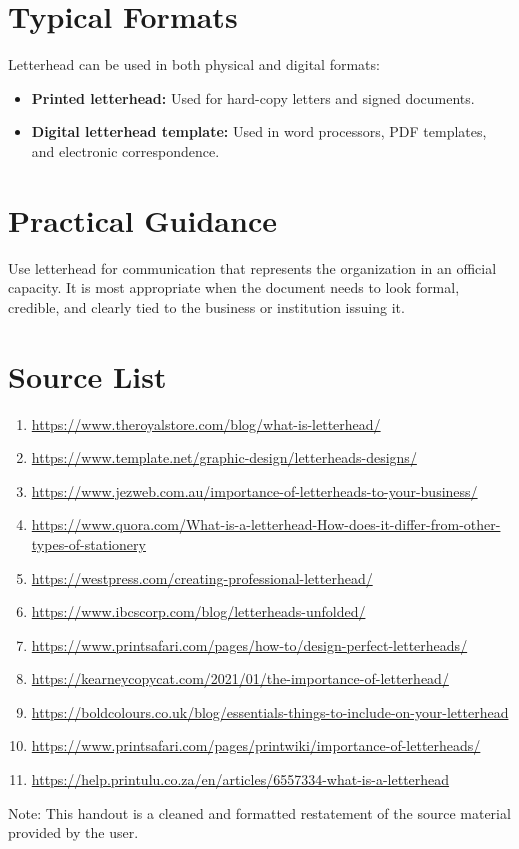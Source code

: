 \documentclass[11pt]{article}
\begin{document}
\section*{Typical Formats}
Letterhead can be used in both physical and digital formats:
\begin{itemize}[leftmargin=1.5em]
    \item \textbf{Printed letterhead:} Used for hard-copy letters and signed documents.
    \item \textbf{Digital letterhead template:} Used in word processors, PDF templates, and electronic correspondence.
\end{itemize}

\section*{Practical Guidance}
Use letterhead for communication that represents the organization in an official capacity. It is most appropriate when the document needs to look formal, credible, and clearly tied to the business or institution issuing it.

\section*{Source List}
\begin{enumerate}[leftmargin=1.75em]
    \item \url{https://www.theroyalstore.com/blog/what-is-letterhead/}
    \item \url{https://www.template.net/graphic-design/letterheads-designs/}
    \item \url{https://www.jezweb.com.au/importance-of-letterheads-to-your-business/}
    \item \url{https://www.quora.com/What-is-a-letterhead-How-does-it-differ-from-other-types-of-stationery}
    \item \url{https://westpress.com/creating-professional-letterhead/}
    \item \url{https://www.ibcscorp.com/blog/letterheads-unfolded/}
    \item \url{https://www.printsafari.com/pages/how-to/design-perfect-letterheads/}
    \item \url{https://kearneycopycat.com/2021/01/the-importance-of-letterhead/}
    \item \url{https://boldcolours.co.uk/blog/essentials-things-to-include-on-your-letterhead}
    \item \url{https://www.printsafari.com/pages/printwiki/importance-of-letterheads/}
    \item \url{https://help.printulu.co.za/en/articles/6557334-what-is-a-letterhead}
\end{enumerate}

\vfill
{\footnotesize Note: This handout is a cleaned and formatted restatement of the source material provided by the user.}
\end{document}
